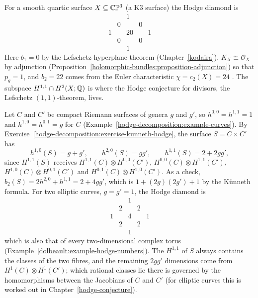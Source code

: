 \begin{example}\label{hodge-decomposition:example-quartic}
For a smooth quartic surface $X \subseteq \mathbb{C}\mathbb{P}^3$ (a K3 surface) the Hodge diamond is
\[
\begin{array}{ccccc}
 & & 1 & & \\
 & 0 & & 0 & \\
1 & & 20 & & 1 \\
 & 0 & & 0 & \\
 & & 1 & &
\end{array}
\]
Here $b_1 = 0$ by the Lefschetz hyperplane theorem (Chapter~\ref{kodaira}), $K_X \cong \mathcal{O}_X$ by adjunction
(Proposition~\ref{holomorphic-bundles:proposition-adjunction}) so that $p_g = 1$, and $b_2 = 22$ comes from the Euler characteristic
$\chi = c_2(X) = 24$ \cite[Chapter VIII]{bhpv}. The subspace $H^{1,1} \cap H^2(X; \mathbb{Q})$ is where the Hodge conjecture for
divisors, the Lefschetz $(1,1)$-theorem, lives.
\end{example}

\begin{example}\label{hodge-decomposition:example-product-curves}
Let $C$ and $C'$ be compact Riemann surfaces of genera $g$ and $g'$, so $h^{0,0} = h^{1,1} = 1$ and $h^{1,0} = h^{0,1} = g$ for $C$ (Example~\ref{hodge-decomposition:example-curves}). By
Exercise~\ref{hodge-decomposition:exercise-kunneth-hodge}, the surface $S = C \times C'$ has
\[
h^{1,0}(S) = g + g', \qquad h^{2,0}(S) = gg', \qquad h^{1,1}(S) = 2 + 2gg',
\]
since $H^{1,1}(S)$ receives $H^{1,1}(C) \otimes H^{0,0}(C')$, $H^{0,0}(C) \otimes H^{1,1}(C')$, $H^{1,0}(C) \otimes H^{0,1}(C')$ and $H^{0,1}(C) \otimes H^{1,0}(C')$. As a check, $b_2(S) = 2h^{2,0} + h^{1,1} = 2 + 4gg'$, which is
$1 + (2g)(2g') + 1$ by the K\"unneth formula. For two elliptic curves, $g = g' = 1$, the Hodge diamond is
\[
\begin{array}{ccccc}
 & & 1 & & \\
 & 2 & & 2 & \\
1 & & 4 & & 1 \\
 & 2 & & 2 & \\
 & & 1 & &
\end{array}
\]
which is also that of every two-dimensional complex torus (Example~\ref{dolbeault:example-hodge-numbers}). The $H^{1,1}$ of $S$ always contains the classes of the two fibres, and the remaining $2gg'$
dimensions come from $H^1(C) \otimes H^1(C')$; which rational classes lie there is governed by the homomorphisms between the Jacobians of $C$ and $C'$ (for elliptic curves this is worked out in
Chapter~\ref{hodge-conjecture}).
\end{example}

